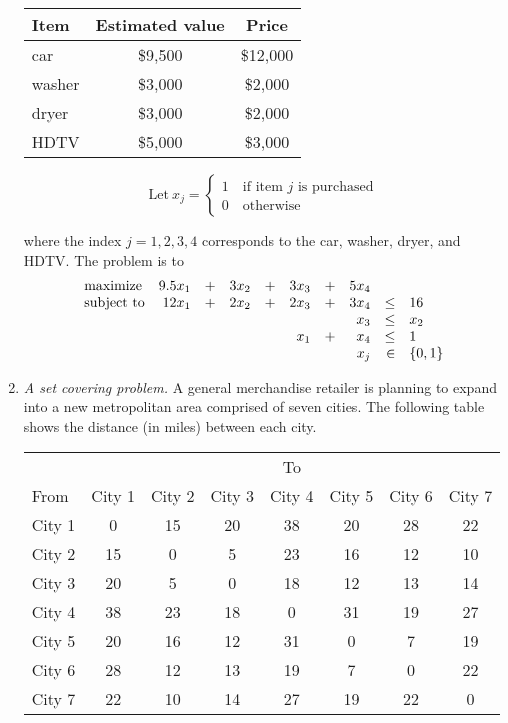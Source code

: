 \begin{enumerate}
\begin{center}
\begin{tabular}{lcc}
Item    &  Estimated value  & Price   \\  \hline
car     &   \$9,500   &  \$12,000 \\
washer  &   \$3,000   &  \$2,000  \\
dryer   &   \$3,000   &  \$2,000  \\
HDTV    &   \$5,000   &  \$3,000  \\
\end{tabular}
\end{center}

\begin{solution}
\bs

\[ \text{Let}~x_j = \begin{cases}
1 \quad \text{if item $j$ is purchased}\\
0 \quad \text{otherwise} \end{cases}
\]

where the index $j = 1,2,3,4$ corresponds to the car, washer, dryer,
and HDTV. The problem is to 
\[
\begin{array}{lrrrrrrrrl}
\textrm{maximize}   & 9.5x_1& +& 3x_2&+& 3x_3 &+& 5x_4 & & \\
  \textrm{subject to} & 12x_1& +& 2x_2&+& 2x_3 &+& 3x_4 & \leq & 16 \\
                    &&&&&& &x_3 & \leq & x_2 \\
                    &&&&& x_1 & + & x_4 &\leq& 1 \\
\multicolumn{8}{r}{x_j}&  \in & \{0,1\}
\end{array}
\]
\end{solution}

\item \emph{A set covering problem.}  A general merchandise retailer
  is planning to expand into a new metropolitan area comprised of
  seven cities. The following table shows the distance (in miles)
  between each city.

\begin{center}
\begin{tabular}{l|ccccccc}
& \multicolumn{7}{c}{To} \\
From & City 1 & City 2 & City 3 & City 4 & City 5 & City 6 & City 7\\ \hline
City 1 & 0 & 15 & 20 & 38 & 20 & 28 & 22 \\
City 2 & 15 & 0 &  5 & 23 & 16 & 12 & 10 \\
City 3 & 20 & 5 & 0 & 18 & 12 & 13 & 14 \\
City 4 & 38 & 23 & 18 & 0 & 31 & 19 & 27 \\
City 5 & 20 & 16 & 12 & 31 & 0 & 7 & 19 \\
City 6 & 28 & 12 & 13 & 19 & 7 & 0 & 22 \\
City 7 & 22 & 10 & 14 & 27 & 19 & 22 & 0 \\
\end{tabular}
\end{center}


\end{enumerate}
